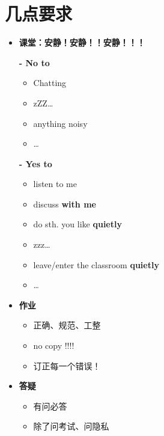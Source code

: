 \section{几点要求}
\begin{itemize}
	\item {\bf 课堂：安静！安静！！安静！！！}
	
	{\bf - No to}
	  \begin{itemize}
	    \item Chatting
	    \item zZZ\ldots
	    \item anything noisy
	    \item \ldots
	  \end{itemize}
	{\bf - Yes to}
  \begin{itemize}
    \item listen to me
    \item discuss {\bf with me}
    \item do sth. you like {\bf quietly}
    \item zzz\ldots
    \item leave/enter the classroom {\bf quietly}
    \item \ldots
  \end{itemize}
  \item {\bf 作业}
  \begin{itemize}
    \item 正确、规范、工整
    \item no copy !!!!
    \item 订正每一个错误！
  \end{itemize}
	\item {\bf 答疑}
	  \begin{itemize}
	    \item 有问必答
	    \item 除了问考试、问隐私
	  \end{itemize}
\end{itemize}

\newpage

